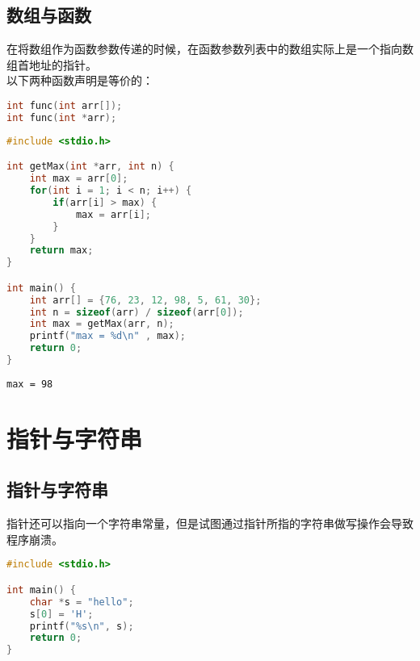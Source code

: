 \subsection{数组与函数}

在将数组作为函数参数传递的时候，在函数参数列表中的数组实际上是一个指向数组首地址的指针。\\

以下两种函数声明是等价的：

\vspace{-0.5cm}

\begin{lstlisting}[language=C]
int func(int arr[]);
int func(int *arr);
\end{lstlisting}

\vspace{0.5cm}


\begin{lstlisting}[language=C]
#include <stdio.h>

int getMax(int *arr, int n) {
    int max = arr[0];
    for(int i = 1; i < n; i++) {
        if(arr[i] > max) {
            max = arr[i];
        }
    }
    return max;
}

int main() {
    int arr[] = {76, 23, 12, 98, 5, 61, 30};
    int n = sizeof(arr) / sizeof(arr[0]);
    int max = getMax(arr, n);
    printf("max = %d\n" , max);
    return 0;
}
\end{lstlisting}

\begin{tcolorbox}
    \begin{verbatim}
max = 98
	\end{verbatim}
\end{tcolorbox}

\newpage

\section{指针与字符串}

\subsection{指针与字符串}

指针还可以指向一个字符串常量，但是试图通过指针所指的字符串做写操作会导致程序崩溃。\\


\begin{lstlisting}[language=C]
#include <stdio.h>

int main() {
    char *s = "hello";
    s[0] = 'H';
    printf("%s\n", s);
    return 0;
}
\end{lstlisting}

